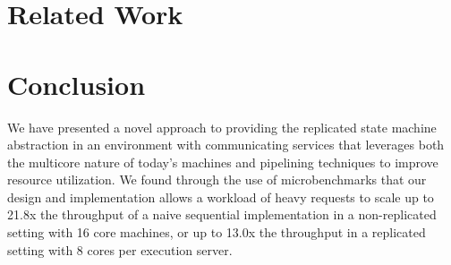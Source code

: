 \documentclass[11pt, oneside]{report}
\begin{document}
\chapter{Related Work}\label{RelatedWork}

\chapter{Conclusion}\label{Conclusion}

We have presented a novel approach to providing the replicated state machine abstraction in an environment with communicating services that leverages both the multicore nature of today's machines and pipelining techniques to improve resource utilization. 
We found through the use of microbenchmarks that our design and implementation allows a workload of heavy requests to scale up to 21.8x the throughput of a naive sequential implementation in a non-replicated setting with 16 core machines, or up to 13.0x the throughput in a replicated setting with 8 cores per execution server.
\end{document}
